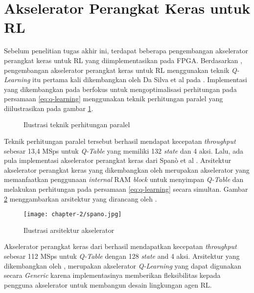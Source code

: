 \section{Akselerator Perangkat Keras untuk \acl{RL}}
\label{sec:accelerator-researches}

Sebelum penelitian tugas akhir ini, terdapat beberapa pengembangan akselerator perangkat keras untuk \ac{RL} yang diimplementasikan pada \ac{FPGA}. Berdasarkan \parencite{sutisna2023faraneq}, pengembangan akselerator perangkat keras untuk \ac{RL} menggunakan teknik \textit{Q-Learning} itu pertama kali dikembangkan oleh Da Silva et al pada \parencite{dasilva2019parallel}. Implementasi yang dikembangkan pada \parencite{dasilva2019parallel} berfokus untuk mengoptimalisasi perhitungan pada persamaan \ref{eq:q-learning} menggunakan teknik perhitungan paralel yang diilustrasikan pada gambar \ref{fig:ilustrasi-dasilvi}.

\begin{figure}[h]
	\centering
	\caption{Ilustrasi teknik perhitungan paralel \parencite{dasilva2019parallel}}
	\label{fig:ilustrasi-dasilvi}
\end{figure}

Teknik perhitungan paralel tersebut berhasil mendapat kecepatan \textit{throughput} sebesar 13,4  \ac{MSps} untuk \textit{Q-Table} yang memiliki 132 \textit{state} dan 4 aksi. Lalu, ada pula implementasi akselerator perangkat keras dari Spanò et al \parencite{spano2019efficient}. Arsitektur akselerator perangkat keras yang dikembangkan oleh \parencite{spano2019efficient} merupakan akselerator yang memanfaatkan penggunaan \textit{internal} \ac{RAM} \textit{block} untuk menyimpan \textit{Q-Table} dan melakukan perhitungan pada persamaan \ref{eq:q-learning} secara simultan. Gambar \ref{fig:ilustrasi-spano} menggambarkan arsitektur yang dirancang oleh \parencite{spano2019efficient}.

\begin{figure}[h]
	\centering
	\texttt{[image: chapter-2/spano.jpg]}
	\caption{Ilustrasi arsitektur akselerator \parencite{spano2019efficient}}
	\label{fig:ilustrasi-spano}
\end{figure}

Akselerator perangkat keras dari \parencite{spano2019efficient} berhasil mendapatkan kecepatan \textit{throughput} sebesar 112 MSps untuk \textit{Q-Table} dengan 128 \textit{state} and 4 aksi. Arsitektur yang dikembangkan oleh \parencite{spano2019efficient}, merupakan akselerator \textit{Q-Learning} yang dapat digunakan secara \textit{Generic} karena implementasinya memberikan fleksibilitas kepada pengguna akselerator untuk membangun desain lingkungan agen \ac{RL}.

